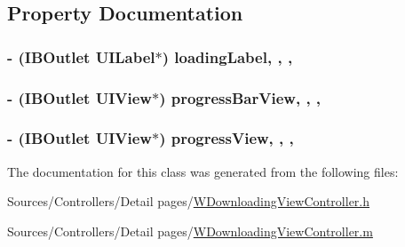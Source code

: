 \subsection{Property Documentation}
\hypertarget{interface_w_downloading_view_controller_a06a9629718c14c68eff60a321732da75}{
\subsubsection[{loading\-Label}]{\setlength{\rightskip}{0pt plus 5cm}-\/ (I\-B\-Outlet U\-I\-Label$\ast$) loading\-Label\hspace{0.3cm}{\ttfamily [read]}, {\ttfamily [write]}, {\ttfamily [nonatomic]}, {\ttfamily [retain]}}}\label{interface_w_downloading_view_controller_a06a9629718c14c68eff60a321732da75}
\hypertarget{interface_w_downloading_view_controller_abbb1a4693db1c23335455c95b2ec14c5}{
\subsubsection[{progress\-Bar\-View}]{\setlength{\rightskip}{0pt plus 5cm}-\/ (I\-B\-Outlet U\-I\-View$\ast$) progress\-Bar\-View\hspace{0.3cm}{\ttfamily [read]}, {\ttfamily [write]}, {\ttfamily [nonatomic]}, {\ttfamily [retain]}}}\label{interface_w_downloading_view_controller_abbb1a4693db1c23335455c95b2ec14c5}
\hypertarget{interface_w_downloading_view_controller_aab7f1b3df20f6c95a8e27320106777b0}{
\subsubsection[{progress\-View}]{\setlength{\rightskip}{0pt plus 5cm}-\/ (I\-B\-Outlet U\-I\-View$\ast$) progress\-View\hspace{0.3cm}{\ttfamily [read]}, {\ttfamily [write]}, {\ttfamily [nonatomic]}, {\ttfamily [retain]}}}\label{interface_w_downloading_view_controller_aab7f1b3df20f6c95a8e27320106777b0}


The documentation for this class was generated from the following files\-:\begin{DoxyCompactItemize}
\item 
Sources/\-Controllers/\-Detail pages/\hyperlink{_w_downloading_view_controller_8h}{W\-Downloading\-View\-Controller.\-h}\item 
Sources/\-Controllers/\-Detail pages/\hyperlink{_w_downloading_view_controller_8m}{W\-Downloading\-View\-Controller.\-m}\end{DoxyCompactItemize}
